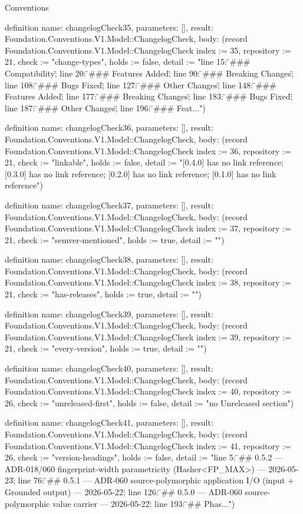 \begin{lexlean}{Conventions}
\begin{semanticmodule}
definition{
  name: changelogCheck35,
  parameters: [],
  result: Foundation.Conventions.V1.Model::ChangelogCheck,
  body: (record Foundation.Conventions.V1.Model::ChangelogCheck {index := 35, repository := 21, check := "change-types", holds := false, detail := "line 15: \"### Compatibility\"; line 20: \"### Features Added\"; line 90: \"### Breaking Changes\"; line 108: \"### Bugs Fixed\"; line 127: \"### Other Changes\"; line 148: \"### Features Added\"; line 177: \"### Breaking Changes\"; line 183: \"### Bugs Fixed\"; line 187: \"### Other Changes\"; line 196: \"### Feat..."})
}

definition{
  name: changelogCheck36,
  parameters: [],
  result: Foundation.Conventions.V1.Model::ChangelogCheck,
  body: (record Foundation.Conventions.V1.Model::ChangelogCheck {index := 36, repository := 21, check := "linkable", holds := false, detail := "[0.4.0] has no link reference; [0.3.0] has no link reference; [0.2.0] has no link reference; [0.1.0] has no link reference"})
}

definition{
  name: changelogCheck37,
  parameters: [],
  result: Foundation.Conventions.V1.Model::ChangelogCheck,
  body: (record Foundation.Conventions.V1.Model::ChangelogCheck {index := 37, repository := 21, check := "semver-mentioned", holds := true, detail := ""})
}

definition{
  name: changelogCheck38,
  parameters: [],
  result: Foundation.Conventions.V1.Model::ChangelogCheck,
  body: (record Foundation.Conventions.V1.Model::ChangelogCheck {index := 38, repository := 21, check := "has-releases", holds := true, detail := ""})
}

definition{
  name: changelogCheck39,
  parameters: [],
  result: Foundation.Conventions.V1.Model::ChangelogCheck,
  body: (record Foundation.Conventions.V1.Model::ChangelogCheck {index := 39, repository := 21, check := "every-version", holds := true, detail := ""})
}

definition{
  name: changelogCheck40,
  parameters: [],
  result: Foundation.Conventions.V1.Model::ChangelogCheck,
  body: (record Foundation.Conventions.V1.Model::ChangelogCheck {index := 40, repository := 26, check := "unreleased-first", holds := false, detail := "no Unreleased section"})
}

definition{
  name: changelogCheck41,
  parameters: [],
  result: Foundation.Conventions.V1.Model::ChangelogCheck,
  body: (record Foundation.Conventions.V1.Model::ChangelogCheck {index := 41, repository := 26, check := "version-headings", holds := false, detail := "line 5: \"## 0.5.2 — ADR-018/060 fingerprint-width parametricity (Hasher<FP_MAX>) — 2026-05-23\"; line 76: \"## 0.5.1 — ADR-060 source-polymorphic application I/O (input + Grounded output) — 2026-05-22\"; line 126: \"## 0.5.0 — ADR-060 source-polymorphic value carrier — 2026-05-22\"; line 193: \"## Phas..."})
}


\end{semanticmodule}
\end{lexlean}

